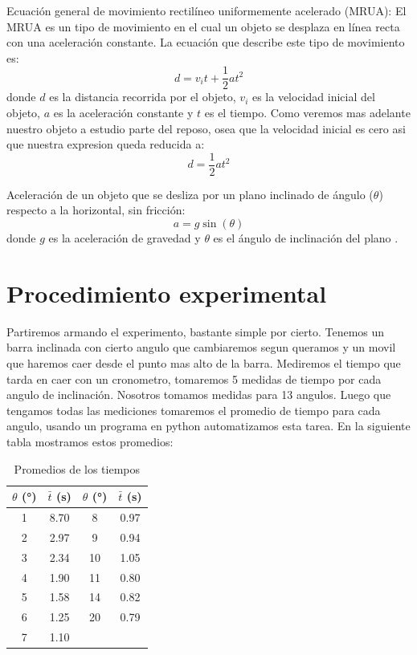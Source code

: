 \documentclass{article}
\begin{document}
Ecuación general de movimiento rectilíneo uniformemente acelerado (MRUA):
El MRUA es un tipo de movimiento en el cual un objeto se desplaza en línea
recta con una aceleración constante. La ecuación que describe este tipo de
movimiento es:
\begin{equation}
d = v_i t + \dfrac{1}{2} a t^2
\end{equation}
donde $d$ es la distancia recorrida por el objeto, $v_i$ es la velocidad
inicial del objeto, $a$ es la aceleración constante y $t$ es el tiempo.
Como veremos mas adelante nuestro objeto a estudio parte del reposo, osea
que la velocidad inicial es cero asi que nuestra expresion queda reducida a:
\begin{equation}
d = \dfrac{1}{2} a t^2
\end{equation}

Aceleración de un objeto que se desliza por un plano inclinado de ángulo 
($\theta$) respecto a la horizontal, sin fricción:
\begin{equation}
a = g \sin(\theta)
\end{equation}
donde $g$ es la aceleración de gravedad y $\theta$ es el ángulo de inclinación
del plano \cite{serway2014physics}.

\section*{Procedimiento experimental}
Partiremos armando el experimento, bastante simple por cierto. Tenemos
un barra inclinada con cierto angulo que cambiaremos segun queramos y 
un movil que haremos caer desde el punto mas alto de la barra. Mediremos
el tiempo que tarda en caer con un cronometro, tomaremos 5 medidas de tiempo
por cada angulo de inclinación. Nosotros tomamos medidas para 13 angulos. 
Luego que tengamos todas las mediciones tomaremos el promedio de tiempo 
para cada angulo, usando un programa en python automatizamos esta tarea.
En la siguiente tabla mostramos estos promedios:

\begin{table}[H]
\centering
\begin{tabular}{|c|c|c|c|}
\hline
$\theta$ (°) & $\bar{t}$ (s) & $\theta$ (°) & $\bar{t}$ (s) \\
\hline
1 & 8.70 & 8 & 0.97 \\
\hline
2 & 2.97 & 9 & 0.94 \\
\hline
3 & 2.34 & 10 & 1.05 \\
\hline
4 & 1.90 & 11 & 0.80 \\
\hline
5 & 1.58 & 14 & 0.82 \\
\hline
6 & 1.25 & 20 & 0.79 \\
\hline
7 & 1.10 & & \\
\hline
\end{tabular}
\caption{Promedios de los tiempos}
\label{tab:promedios-tiempos}
\end{table}
\end{document}
